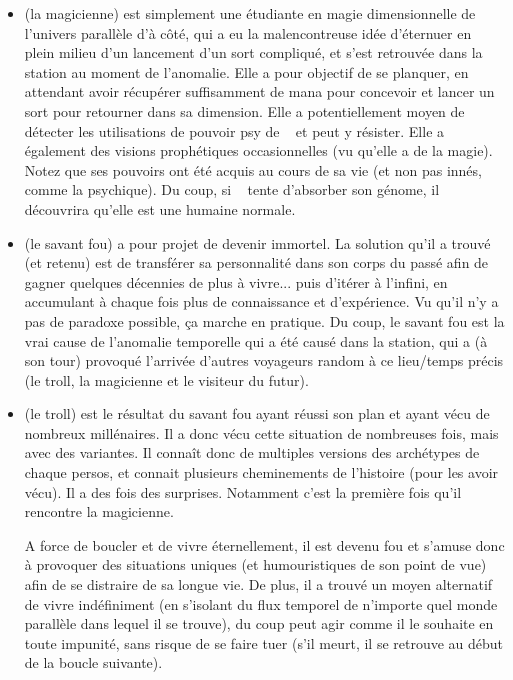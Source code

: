 {\begin{itemize}
		\item \nmPlayerVI (la magicienne) est simplement une étudiante en magie dimensionnelle de l'univers parallèle d'à côté, qui a eu la malencontreuse idée d'éternuer en plein milieu d'un lancement d'un sort compliqué, et s'est retrouvée dans la station au moment de l'anomalie. Elle a pour objectif de se planquer, en attendant avoir récupérer suffisamment de mana pour concevoir et lancer un sort pour retourner dans sa dimension. Elle a potentiellement moyen de détecter les utilisations de pouvoir psy de \nmPlayerIX~  et peut y résister. Elle a également des visions prophétiques occasionnelles (vu qu'elle a de la magie). Notez que ses pouvoirs ont été acquis au cours de sa vie (et non pas innés, comme la psychique). Du coup, si \nmPlayerX ~ tente d'absorber son génome, il découvrira qu'elle est une humaine normale.
		
		\item \nmPlayerI (le savant fou) a pour projet de devenir immortel. La solution qu'il a trouvé (et retenu) est de transférer sa personnalité dans son corps du passé afin de gagner quelques décennies de plus à vivre... puis d'itérer à l'infini, en accumulant à chaque fois plus de connaissance et d'expérience. Vu qu'il n'y a pas de paradoxe possible, ça marche en pratique. Du coup, le savant fou est la vrai cause de l'anomalie temporelle qui a été causé dans la station, qui a (à son tour) provoqué l'arrivée d'autres voyageurs random à ce lieu/temps précis (le troll, la magicienne et le visiteur du futur).
		
		\item \nmPlayerIV (le troll) est le résultat du savant fou ayant réussi son plan et ayant vécu de nombreux millénaires. Il a donc vécu cette situation de nombreuses fois, mais avec des variantes. Il connaît donc de multiples versions des archétypes de chaque persos, et connait plusieurs cheminements de l'histoire (pour les avoir vécu). Il a des fois des surprises. Notamment c'est la première fois qu'il rencontre la magicienne.
		
		A force de boucler et de vivre éternellement, il est devenu fou et s'amuse donc à provoquer des situations uniques (et humouristiques de son point de vue) afin de se distraire de sa longue vie. De plus, il a trouvé un moyen alternatif de vivre indéfiniment (en s'isolant du flux temporel de n'importe quel monde parallèle dans lequel il se trouve), du coup peut agir comme il le souhaite en toute impunité, sans risque de se faire tuer (s'il meurt, il se retrouve au début de la boucle suivante).
		

\end{itemize}}
